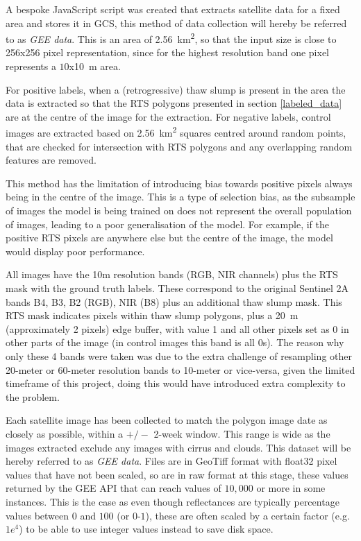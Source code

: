 A bespoke JavaScript script was created that extracts satellite data for a fixed area and stores it in \gls{GCS}, this method of data collection will hereby be referred to as \textit{\gls{GEE} data}. This is an area of \SI{2.56}{\kilo\metre\squared}, so that the input size is close to 256x256 pixel representation, since for the highest resolution band one pixel represents a $10$x\SI{10}{\metre} area.

For positive labels, when a (retrogressive) thaw slump is present in the area the data is extracted so that the \gls{RTS} polygons presented in section \ref{labeled_data} are at the centre of the image for the extraction.
For negative labels, control images are extracted based on \SI{2.56}{\kilo\metre\squared} squares centred around random points, that are checked for intersection with \gls{RTS} polygons and any overlapping random features are removed. 

This method has the limitation of introducing bias towards positive pixels always being in the centre of the image. This is a type of selection bias, as the subsample of images the model is being trained on does not represent the overall population of images, leading to a poor generalisation of the model. For example, if the positive \gls{RTS} pixels are anywhere else but the centre of the image, the model would display poor performance.

All images have the 10m resolution bands (\gls{RGB}, \gls{NIR} channels) plus the \gls{RTS} mask with the ground truth labels. These correspond to the original Sentinel 2A bands B4, B3, B2 (\gls{RGB}), \gls{NIR} (B8) plus an additional thaw slump mask. This \gls{RTS} mask indicates pixels within thaw slump polygons, plus a \SI{20}{\metre} (approximately 2 pixels) edge buffer, with value 1 and all other pixels set as 0 in other parts of the image (in control images this band is all 0s). The reason why only these 4 bands were taken was due to the extra challenge of resampling other 20-meter or 60-meter resolution bands to 10-meter or vice-versa, given the limited timeframe of this project, doing this would have introduced extra complexity to the problem.

Each satellite image has been collected to match the polygon image date as closely as possible, within a $+/-$ 2-week window. This range is wide as the images extracted exclude any images with cirrus and clouds. This dataset will be hereby referred to as \textit{\gls{GEE} data}.
Files are in GeoTiff format with float32 pixel values that have not been scaled, so are in raw format at this stage, these values returned by the \gls{GEE} API that can reach values of $10,000$ or more in some instances. This is the case as even though reflectances are typically percentage values between $0$ and $100$ (or $0$-$1$), these are often scaled by a certain factor (e.g. $1 e^4$) to be able to use integer values instead to save disk space. 

